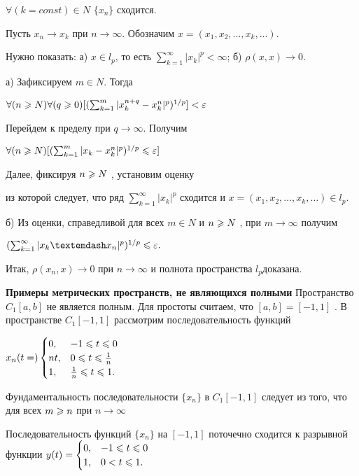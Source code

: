 \begin{enumerate}
          $\forall(k=const) \in  N$ $\{x_n \}$ сходится.

          Пусть $x_n \rightarrow x_k$ при $n \rightarrow
              \infty $. Обозначим $x = (x_1, x_2, \dots , x_k, \dots)$.

          Нужно показать:
          а) $x \in  l_p$, то есть	$\sum^\infty_{k=1}|x_k|^p<\infty$;
          б) $\rho(x , x) \rightarrow 0$.

          а) Зафиксируем $m \in  N$. Тогда

          $\forall( n \geqslant  N )\forall( q \geqslant  0)[(\sum^m_{k=1}|x^{n+q}_k-x^n_k|^p)
              ^{1/p}]<\varepsilon$

          Перейдем к пределу при $q \rightarrow \infty $. Получим

          $\forall(n\geqslant N)[(\sum^m_{k=1}|x_k-x^n_k|^p)^{1/p}\leqslant\varepsilon]$

          Далее, фиксируя $n \geqslant  N$ , установим оценку

          из которой следует, что ряд $\sum^{\infty }_{k=1} |x_k|^p$  сходится
          и $x = (x_1, x_2, \dots , x_k, \dots) \in  l_p$.

          б) Из оценки, справедливой для всех $m \in  N$ и $n \geqslant  N$ , при $m \rightarrow \infty $
          получим

          $(\sum^\infty_{k=1}|x_k— x_n|^p)^{1/p} \mr  \varepsilon.$

          Итак, $\rho(x_n, x) \rightarrow 0$ при $n \rightarrow \infty $ и полнота
          пространства $l_p $доказана.

\end{enumerate}

\noindent\dotfill
    
\textbf{Примеры метрических пространств, не являющихся полными}
Пространство $C_1[a, b]$  не является полным. Для простоты считаем, что $[a, b] =
    [-1, 1]$
. В пространстве $C_1[-1, 1]$ рассмотрим последовательность функций

$x_n(t=)\begin{cases}
        0,  & -1\leqslant t \leqslant 0           \\
        nt, & 0 \leqslant t \leqslant \frac{1}{n} \\
        1,  & \frac{1}{n}\leqslant t \leqslant 1.
    \end{cases}$

Фундаментальность последовательности $\{x_n\}$ в $C_1[-1, 1]$ следует из того,
что для всех $m \geqslant n$ при $n \rightarrow \infty $

Последовательность функций $\{x_n\}$ на $[-1, 1]$ поточечно сходится к разрывной
функции
$y(t) =	\begin{cases}0, & -1 \leqslant  t \leqslant  0 \\
             1, & 0 < t \leqslant  1 .
    \end{cases}$

